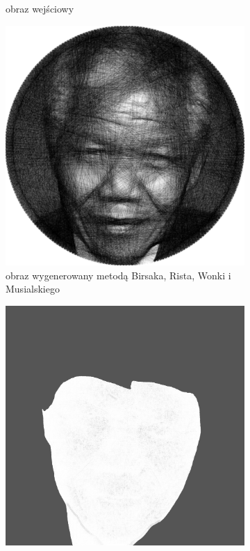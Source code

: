 \begin{figure}[H]
\begin{subfigure}{0.24\textwidth}
        \caption{obraz wejściowy}
        \label{comp-comp-gandhi-mandela-e}
    \end{subfigure}
    \begin{subfigure}{0.24\textwidth}
        \centering
        \includegraphics[width = \textwidth]{img/6-comp/mandela_birsak_.png}
        \caption{obraz wygenerowany metodą Birsaka, Rista, Wonki i Musialskiego}
        \label{comp-comp-gandhi-mandela-f}
    \end{subfigure}
    \begin{subfigure}{0.24\textwidth}
        \centering
        \includegraphics[width = \textwidth]{img/6-comp/mandela_mask_c15_inv0_bg5_obj1_ed1.png}

\end{subfigure}
\end{figure}

